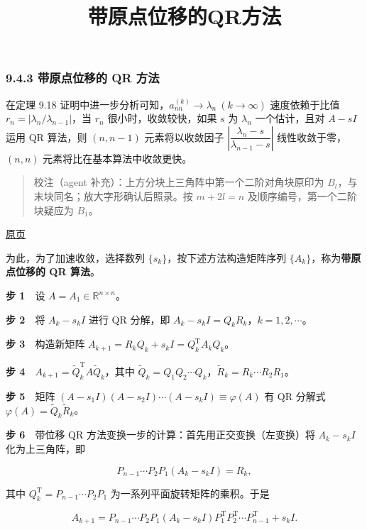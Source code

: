 \documentclass[
  10pt,
  fontset=fandol]{ctexart}
\title{带原点位移的QR方法}
\author{}
\date{}
\begin{document}
\maketitle

\subsubsection{9.4.3 带原点位移的 QR 方法}\label{ux5e26ux539fux70b9ux4f4dux79fbux7684-qr-ux65b9ux6cd5}

在定理 9.18 证明中进一步分析可知，\(a_{nn}^{(k)}\to\lambda_n\ (k\to\infty)\) 速度依赖于比值 \(r_n=|\lambda_n/\lambda_{n-1}|\)，当 \(r_n\) 很小时，收敛较快，如果 \(s\) 为 \(\lambda_n\) 一个估计，且对 \(A-sI\) 运用 QR 算法，则 \((n,n-1)\) 元素将以收敛因子 \(\left|\dfrac{\lambda_n-s}{\lambda_{n-1}-s}\right|\) 线性收敛于零，\((n,n)\) 元素将比在基本算法中收敛更快。

\begin{quote}
校注（agent 补充）：上方分块上三角阵中第一个二阶对角块原印为 \(B_l\)，与末块同名；放大字形确认后照录。按 \(m+2l=n\) 及顺序编号，第一个二阶块疑应为 \(B_1\)。
\end{quote}

\href{../../source-images/pdf-256.jpeg}{原页}

为此，为了加速收敛，选择数列 \(\{s_k\}\)，按下述方法构造矩阵序列 \(\{A_k\}\)，称为\textbf{带原点位移的 QR 算法}。

\textbf{步 1}　设 \(A=A_1\in\mathbb R^{n\times n}\)。

\textbf{步 2}　将 \(A_k-s_kI\) 进行 QR 分解，即 \(A_k-s_kI=Q_kR_k\)，\(k=1,2,\cdots\)。

\textbf{步 3}　构造新矩阵 \(A_{k+1}=R_kQ_k+s_kI=Q_k^{\mathrm T}A_kQ_k\)。

\textbf{步 4}　\(A_{k+1}=\widetilde Q_k^{\mathrm T}A\widetilde Q_k\)，其中 \(\widetilde Q_k=Q_1Q_2\cdots Q_k\)，\(\widetilde R_k=R_k\cdots R_2R_1\)。

\textbf{步 5}　矩阵 \((A-s_1I)(A-s_2I)\cdots(A-s_kI)\equiv\varphi(A)\) 有 QR 分解式 \(\varphi(A)=\widetilde Q_k\widetilde R_k\)。

\textbf{步 6}　带位移 QR 方法变换一步的计算：首先用正交变换（左变换）将 \(A_k-s_kI\) 化为上三角阵，即

\[
P_{n-1}\cdots P_2P_1(A_k-s_kI)=R_k,
\]

其中 \(Q_k^{\mathrm T}=P_{n-1}\cdots P_2P_1\) 为一系列平面旋转矩阵的乘积。于是

\[
A_{k+1}=P_{n-1}\cdots P_2P_1(A_k-s_kI)P_1^{\mathrm T}P_2^{\mathrm T}\cdots P_{n-1}^{\mathrm T}+s_kI.
\]
\end{document}
